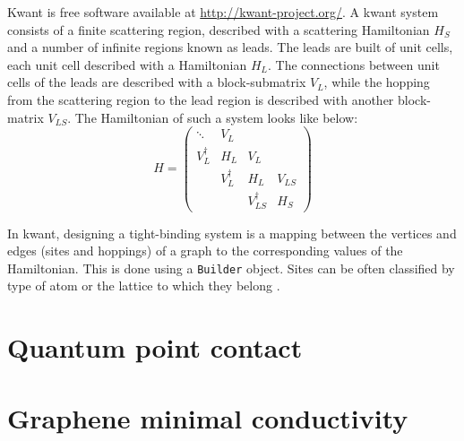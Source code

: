 \documentclass[11pt, a4paper, twocolumn]{article}
\begin{document}
Kwant is free software available at \url{http://kwant-project.org/}. A kwant system consists of a finite scattering region,
described with a scattering Hamiltonian $H_S$ and a number of infinite regions known as leads.
The leads are built of unit cells, each unit cell described with a Hamiltonian $H_L$. The connections
between unit cells of the leads are described with a block-submatrix $V_L$, while the hopping from the scattering region
to the lead region is described with another block-matrix $V_{LS}$. The Hamiltonian of such a system looks like below:
\begin{equation*}
  H = \left(
    \begin{array}{cccc}
      \ddots     & V_L        &                  &        \\
      V_L^{\dag} & H_L        & V_L              &        \\
                 & V_L^{\dag} & H_L              &  V_{LS}\\
                 &            & V_{LS}^{\dag}    & H_S
    \end{array}
  \right)
\end{equation*}

\par In kwant, designing a tight-binding system is a mapping between the vertices and edges (sites and hoppings) of
a graph to the corresponding values of the Hamiltonian. This is done using a \texttt{Builder} object. Sites can
be often classified by type of atom or the lattice to which they belong \cite{kwant-paper}.

\section*{Quantum point contact}
\section*{Graphene minimal conductivity}

\end{document}
